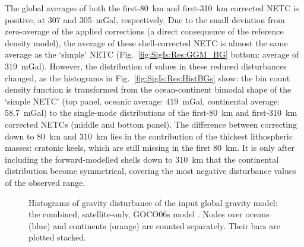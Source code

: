 The global averages of both the first-\SI{80}{\kilo \metre} and first-\SI{310}{\kilo \metre} corrected NETC is positive, at \num{307} and \SI{305}{mGal}, respectively.
Due to the small deviation from zero-average of the applied corrections (a direct consequence of the reference density model), the average of these shell-corrected NETC is almost the same average as the `simple' NETC (Fig.~\ref{fig:SigIs:Res:GGM_BG} bottom: average of \SI{319}{mGal}).
However, the distribution of values in these reduced disturbances changed, as the histograms in Fig.~\ref{fig:SigIs:Res:HistBGs} show: the bin count density function is transformed from the ocean-continent bimodal shape of the `simple NETC' (top panel, oceanic average: \SI{419}{mGal}, continental average: \SI{58.7}{mGal}) to the single-mode distributions of the first-\SI{80}{\kilo \metre} and first-\SI{310}{\kilo \metre} corrected NETCs (middle and bottom panel).
The difference between correcting down to \SI{80}{\kilo \metre} and \SI{310}{\kilo \metre} lies in the contribution of the thickest lithospheric masses: cratonic keels, which are still missing in the first \SI{80}{\kilo \metre}.
It is only after including the forward-modelled shells down to \SI{310}{\kilo \metre} that the continental distribution become symmetrical, covering the most negative disturbance values of the observed range.

\begin{figure}[hb]
    \begin{adjustbox}{center}
    \end{adjustbox}
    \caption[Histogram of the disturbance from the input global gravity model.]{
        Histograms of gravity disturbance of the input global gravity model: the combined, satellite-only, GOCO06s model \parencite{Kvas_GOCO06s_dataset}.
        Nodes over oceans (blue) and continents (orange) are counted separately. Their bars are plotted stacked.
    }
    \label{fig:SigIs:Res:HistGGMin}
\end{figure}

